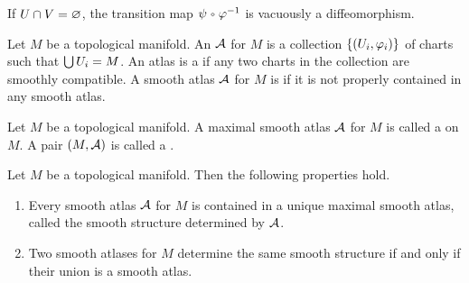 \documentclass[10pt]{article}
\begin{document}
\begin{center}
\end{center}
\par
If $U\cap V=\varnothing$, the transition map $\psi\comp{\vp}^{-1}$ is vacuously a diffeomorphism.
\begin{definition}
    Let $M$ be a topological manifold. An  $\mathcal{A}$ for $M$ is a collection $\{({U}_{i},{\varphi}_{i})\}$ of charts such that $\bigcup{U}_{i}=M$. An atlas is a  if any two charts in the collection are smoothly compatible. A smooth atlas $\mathcal{A}$ for $M$ is  if it is not properly contained in any smooth atlas. 
\end{definition}
\begin{definition}
    Let $M$ be a topological manifold. A maximal smooth atlas $\mathcal{A}$ for $M$ is called a  on $M$. A pair $(M,\mathcal{A})$ is called a .
\end{definition}
\begin{proposition}
    Let $M$ be a topological manifold. Then the following properties hold.
    \begin{enumerate}
        \item Every smooth atlas $\mathcal{A}$ for $M$ is contained in a unique maximal smooth atlas, called the smooth structure determined by $\mathcal{A}$.
        \item Two smooth atlases for $M$ determine the same smooth structure if and only if their union is a smooth atlas.
    \end{enumerate}
\end{proposition}
\end{document}
